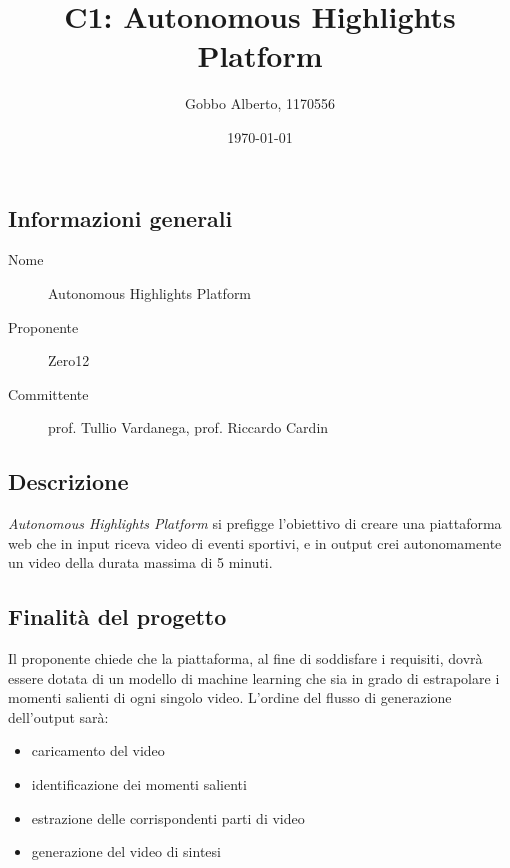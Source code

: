 \documentclass[../studio-di-fattibilita.tex]{subfiles}
\title{C1: Autonomous Highlights Platform}
\author{Gobbo Alberto, 1170556}
\date{\today}
\begin{document}
	\subsection{Informazioni generali}
	\label{sec:informazioni_generali}
	\begin{description}
		\item[Nome] Autonomous Highlights Platform
		\item[Proponente] Zero12
		\item[Committente] prof. Tullio Vardanega, prof. Riccardo Cardin
	\end{description}
	\subsection{Descrizione}
	\label{sec:descrizione}
	\textit{Autonomous Highlights Platform} si prefigge l'obiettivo di creare una piattaforma web che in input riceva video di eventi sportivi, e in output crei autonomamente un video della durata massima di 5 minuti.
	\subsection{Finalità del progetto}
	\label{sec:finalità_del_progetto}
	Il proponente chiede che la piattaforma, al fine di soddisfare i requisiti, dovrà essere dotata di un modello di machine learning che sia in grado di estrapolare i momenti salienti di ogni singolo video. L'ordine del flusso di generazione dell'output sarà:
	\begin{itemize}
		\item caricamento del video
		\item identificazione dei momenti salienti
		\item estrazione delle corrispondenti parti di video
		\item generazione del video di sintesi	
	\end{itemize}
\end{document}
